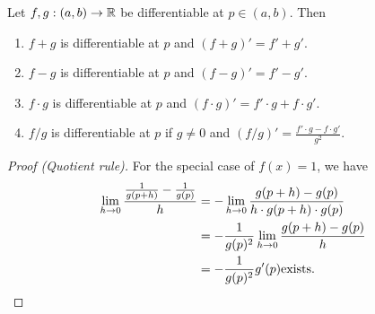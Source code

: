 \begin{thm} \label{thm:diff:laws}
    Let $f, g : (a, b) \to \mathbb{R}$ be differentiable at $p \in (a, b)$. Then
    \begin{enumerate}[label=(\alph*)]
        \item $f + g$ is differentiable at $p$ and $(f + g)' = f' + g'$.
        \item $f - g$ is differentiable at $p$ and $(f - g)' = f' - g'$.
        \item $f \cdot g$ is differentiable at $p$ and $(f \cdot g)' = f' \cdot g + f \cdot g'$.
        \item $f / g$ is differentiable at $p$ if $g \neq 0$ and $(f / g)' = \frac{f' \cdot g - f \cdot g'}{g^2}$.
    \end{enumerate}
\end{thm}
\begin{proof}[Proof (Quotient rule)]
    For the special case of $f(x) = 1$, we have
    \begin{align*}
        \lim_{h \to 0} \frac{\frac{1}{g(p + h)} - \frac{1}{g(p)}}{h} &= - \lim_{h \to 0} \frac{g(p + h) - g(p)}{h \cdot g(p + h) \cdot g(p)} \\
        &= - \frac{1}{g(p)^{2}} \lim_{h \to 0} \frac{g(p + h) - g(p)}{h} \\
        &= - \frac{1}{g(p)^{2}} g'(p) \text{exists}. \qedhere
    \end{align*}
\end{proof}

